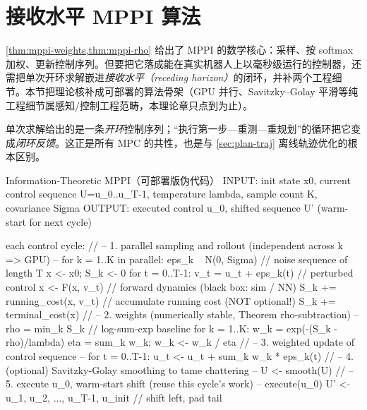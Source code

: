 \section{接收水平 MPPI 算法}
\label{sec:mppi-algorithm}

\cref{thm:mppi-weights,thm:mppi-rho} 给出了 MPPI 的数学核心：采样、按 softmax 加权、更新控制序列。但要把它落成能在真实机器人上以毫秒级运行的控制器，还需把单次开环求解嵌进\emph{接收水平（receding horizon）}的闭环，并补两个工程细节。本节把理论核补成可部署的算法骨架（GPU 并行、Savitzky--Golay 平滑等纯工程细节属感知/控制工程范畴，本理论章只点到为止）。

\begin{algo}\label{alg:mppi}
单次求解给出的是一条\emph{开环}控制序列；“执行第一步—重测—重规划”的循环把它变成\emph{闭环反馈}。这正是所有 MPC 的共性，也是与 \cref{sec:plan-traj} 离线轨迹优化的根本区别。
\end{algo}

\begin{codebox}[text]{Information-Theoretic MPPI（可部署版伪代码）}
INPUT:  init state x0, current control sequence U={u_0..u_{T-1}},
        temperature lambda, sample count K, covariance Sigma
OUTPUT: executed control u_0, shifted sequence U' (warm-start for next cycle)

each control cycle:
  // -- 1. parallel sampling and rollout (independent across k => GPU) --
  for k = 1..K  in parallel:
    eps_k ~ N(0, Sigma)              // noise sequence of length T
    x <- x0;  S_k <- 0
    for t = 0..T-1:
      v_t = u_t + eps_k(t)           // perturbed control
      x <- F(x, v_t)                 // forward dynamics (black box: sim / NN)
      S_k += running_cost(x, v_t)    // accumulate running cost  (NOT optional!)
    S_k += terminal_cost(x)
  // -- 2. weights (numerically stable, Theorem rho-subtraction) --
  rho = min_k S_k                    // log-sum-exp baseline
  for k = 1..K:  w_k = exp(-(S_k - rho)/lambda)
  eta = sum_k w_k;  w_k <- w_k / eta
  // -- 3. weighted update of control sequence --
  for t = 0..T-1:  u_t <- u_t + sum_k w_k * eps_k(t)
  // -- 4. (optional) Savitzky-Golay smoothing to tame chattering --
  U <- smooth(U)
  // -- 5. execute u_0, warm-start shift (reuse this cycle's work) --
  execute(u_0)
  U' <- {u_1, u_2, ..., u_{T-1}, u_init}     // shift left, pad tail
\end{codebox}

